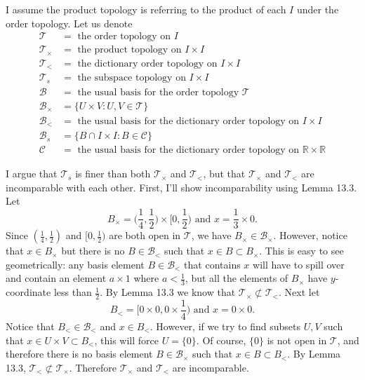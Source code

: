 \documentclass[11pt]{article}
\begin{document}
\begin{solution}
  I assume the product topology is referring to the product of each $I$ under
  the order topology. Let us denote
  \begin{align*}
    \mathcal{T} \;&= \text{ the order topology on } I \\
    \mathcal{T}_\times &= \text{ the product topology on } I \times I \\
    \mathcal{T}_< &= \text{ the dictionary order topology on } I \times I \\
    \mathcal{T}_s \;&= \text{ the subspace topology on } I \times I \\
    \mathcal{B} \;\;&= \text{ the usual basis for the order topology } \mathcal{T} \\
    \mathcal{B}_\times &= \{U \times V : U, V \in \mathcal{T} \} \\
    \mathcal{B}_< &= \text{ the usual basis for the dictionary order topology on } I \times I \\
    \mathcal{B}_s \;&= \{B \cap I \times I : B \in \mathcal{C} \} \\
    \mathcal{C} \;\;&= \text{ the usual basis for the dictionary order topology on }
      \mathbb{R} \times \mathbb{R}
  \end{align*}

  I argue that $\mathcal{T}_s$ is finer than both $\mathcal{T}_\times$ and
  $\mathcal{T}_<$, but that $\mathcal{T}_\times$ and $\mathcal{T}_<$ are
  incomparable with each other.
  First, I'll show incomparability using Lemma 13.3.
  Let
  \[ B_\times = \Big(\frac{1}{4}, \frac{1}{2}\Big) \times \Big[0, \frac{1}{2}\Big)
    \text{ and } x = \frac{1}{3} \times 0.
  \]
  Since $(\frac{1}{4}, \frac{1}{2})$ and $[0, \frac{1}{2})$ are both open in
  $\mathcal{T}$, we have $B_\times  \in \mathcal{B}_\times.$
  However, notice that $x \in B_\times$ but there is no $B \in \mathcal{B}_<$
  such that $x \in B \subset B_\times.$ This is easy to see
  geometrically: any basis element $B \in \mathcal{B}_<$ that contains
  $x$ will have to spill over and contain an element $a \times 1$ where
  $a < \frac{1}{3}$, but all the elements of $B_\times$ have
  $y$-coordinate less than $\frac{1}{2}$. By Lemma 13.3 we know that
  $\mathcal{T}_\times \not\subset \mathcal{T}_<$. Next let
  \[ B_< = \Big[0 \times 0, 0 \times \frac{1}{4}\Big)
    \text{ and } x = 0 \times 0.
  \]
  Notice that $B_< \in \mathcal{B}_<$ and $x \in B_<$. However, if we try to
  find subsets $U, V$ such that $x \in U \times V \subset B_<$, this will force
  $U = \{0\}.$ Of course, $\{0\}$ is not open in $\mathcal{T}$, and therefore
  there is no basis element $B \in \mathcal{B}_\times$ such that $x \in B
  \subset B_<$. By Lemma 13.3, $\mathcal{T}_< \not\subset \mathcal{T}_\times$.
  Therefore $\mathcal{T}_\times$ and $\mathcal{T}_<$ are incomparable.


\end{solution}
\end{document}
